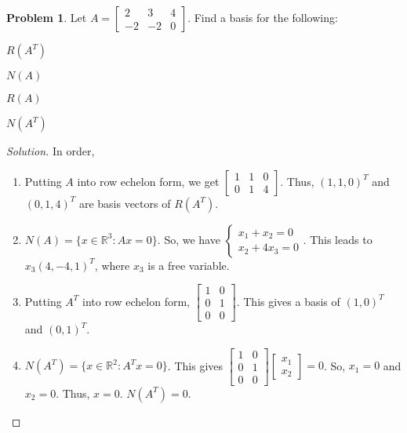 \documentclass[oneside]{book}
\theoremstyle{definition}
\newtheorem{problem}{Problem}[section]
\begin{document}
\begin{problem}
Let $A = \begin{bmatrix} 2 & 3 & 4 \\ -2 & -2 & 0 \end{bmatrix}$. Find a basis for the following:
\begin{enumerate}
\begin{multicols}{4}
\item $R(A^T)$
\item $N(A)$
\item $R(A)$
\item $N(A^T)$
\end{multicols}
\end{enumerate}
\end{problem}
\begin{proof}[Solution]
In order,
\begin{enumerate}
\item Putting $A$ into row echelon form, we get $\begin{bmatrix} 1 & 1 & 0 \\ 0 & 1 & 4 \end{bmatrix}$. Thus, $(1,1,0)^T$ and $(0,1,4)^T$ are basis vectors of $R(A^T)$.
\item $N(A) = \{x\in \mathbb{R}^3: Ax = 0\}$. So, we have $\begin{cases} x_1 + x_2 = 0 \\ x_2 + 4x_3 = 0\end{cases}$. This leads to $x_3(4,-4,1)^T$, where $x_3$ is a free variable.
\item Putting $A^T$ into row echelon form, $\begin{bmatrix} 1 & 0 \\ 0 & 1 \\ 0 & 0 \end{bmatrix}$. This gives a basis of $(1,0)^T$ and $(0,1)^T$.
\item $N(A^T) = \{x\in \mathbb{R}^2: A^Tx = 0\}$. This gives $\begin{bmatrix} 1 & 0 \\ 0 & 1 \\ 0 & 0 \end{bmatrix} \begin{bmatrix}x_1 \\ x_2 \end{bmatrix} = 0$. So, $x_1 = 0$ and $x_2 = 0$. Thus, $x=0$. $N(A^T) = 0$.
\end{enumerate}
\end{proof}
\end{document}
